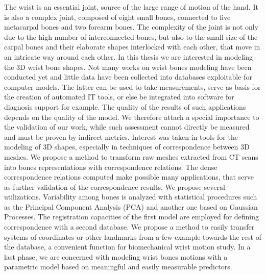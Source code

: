 \pagestyle{empty}


\footnotesize

The wrist is an essential joint, source of the large range of motion of the hand. It is also a complex joint, composed of eight small bones, connected to five metacarpal bones and two forearm bones. The complexity of the joint is not only due to the  high number of interconnected bones, but also to the small size of the carpal bones and their elaborate shapes interlocked with each other, that move in an intricate way around each other. 
In this thesis we are interested in modeling the 3D wrist bone shapes. Not many works on wrist bones modeling have been conducted yet and little data have been collected into databases exploitable for computer models. The latter can be used to take measurements, serve as basis for the creation of automated IT tools, or else be integrated into software for diagnosis support for example. The quality of the results of such applications depends on the quality of the model. We therefore attach a special importance to the validation of our work, while such assessment cannot directly be measured and must be proven by indirect metrics. 
Interest was taken in tools for the modeling of 3D shapes, especially in techniques of correspondence between 3D meshes. We propose a method to transform raw meshes extracted from CT scans into bones representations with correspondence relations.
 The dense correspondence relations computed make possible many applications, that serve as further validation of the correspondence results. We propose several utilizations. Variability among bones is analyzed with statistical procedures such as the Principal Component Analysis (PCA) and another one based on Gaussian Processes.
The registration capacities of the first model are employed for defining correspondence with a second database. We propose a method to easily transfer systems of coordinates or other landmarks from a few example towards the rest of the database, a convenient function for biomechanical wrist motion study. In a last phase, we are concerned with modeling wrist bones motions with a parametric model based on meaningful and easily measurable predictors.

\etoile

\pagestyle{empty}

\footnotesize

